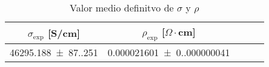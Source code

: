 \begin{table}[H]
    \centering
\begin{tabular}{ccccc}
\toprule
$\sigma_{\exp}$ [S/cm] & $\rho_{\exp}$ [$\Omega \cdot$cm] \\
\midrule
\num{46295.188(87.251)} & \num{0.000021601(0.000000041)} \\
\bottomrule
\end{tabular}
    \caption{Valor medio definitvo de $\sigma$ y $\rho $}
    \label{Tab:S5}
\end{table}
